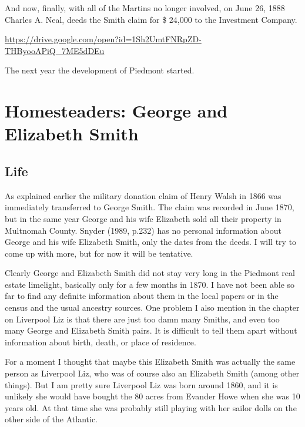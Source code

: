 \documentclass[
  12pt,
]{book}
\begin{document}
And now, finally, with all of the Martins no longer involved, on June 26, 1888 Charles A. Neal, deeds the Smith claim for \$ 24,000 to the Investment Company.

\url{https://drive.google.com/open?id=1Sh2UmtFNRpZD-THByooAPiQ_7ME5dDEu}

The next year the development of Piedmont started.

\hypertarget{homesteaders-george-and-elizabeth-smith}{%
\section{Homesteaders: George and Elizabeth Smith}\label{homesteaders-george-and-elizabeth-smith}}

\hypertarget{life-1}{%
\subsection{Life}\label{life-1}}

As explained earlier the military donation claim of Henry Walsh in 1866 was immediately transferred to George Smith. The claim was recorded in June 1870, but in the same year George and his wife Elizabeth sold all their property in Multnomah County. Snyder (1989, p.232) has no personal information about George and his wife Elizabeth Smith, only the dates from the deeds. I will try to come up with more, but for now it will be tentative.

Clearly George and Elizabeth Smith did not stay very long in the Piedmont real estate limelight, basically only for a few months in 1870. I have not been able so far to find any definite information about them in the local papers or in the census and the usual ancestry sources. One problem I also mention in the chapter on Liverpool Liz is that there are just too damn many Smiths, and even too many George and Elizabeth Smith pairs. It is difficult to tell them apart without information about birth, death, or place of residence.

For a moment I thought that maybe this Elizabeth Smith was actually the same person as Liverpool Liz, who was of course also an Elizabeth Smith (among other things). But I am pretty sure Liverpool Liz was born around 1860, and it is unlikely she would have bought the 80 acres from Evander Howe when she was 10 years old. At that time she was probably still playing with her sailor dolls on the other side of the Atlantic.
\end{document}

